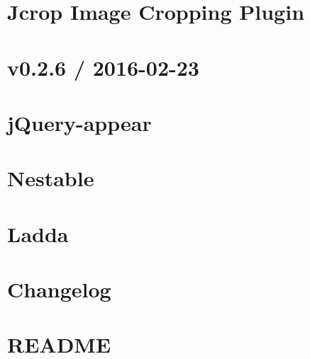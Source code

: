 \documentclass[twoside]{book}
\newcommand{\+}{\discretionary{\mbox{\scriptsize$\hookleftarrow$}}{}{}}
\begin{document}
\chapter{Jcrop Image Cropping Plugin}
\label{md_app_web_bower_components__jcrop__r_e_a_d_m_e}

\chapter{v0.2.6 / 2016-\/02-\/23}
\label{md_app_web_bower_components_jquery-appear__c_h_a_n_g_e_l_o_g}

\chapter{j\+Query-\/appear}
\label{md_app_web_bower_components_jquery-appear__r_e_a_d_m_e}

\chapter{Nestable}
\label{md_app_web_bower_components_jquery-nestable__r_e_a_d_m_e}

\chapter{Ladda}
\label{md_app_web_bower_components_ladda__r_e_a_d_m_e}

\chapter{Changelog}
\label{md_app_web_bower_components_moment__c_h_a_n_g_e_l_o_g}

\chapter{R\+E\+A\+D\+ME}
\label{md_app_web_bower_components_moment__r_e_a_d_m_e}

\end{document}
